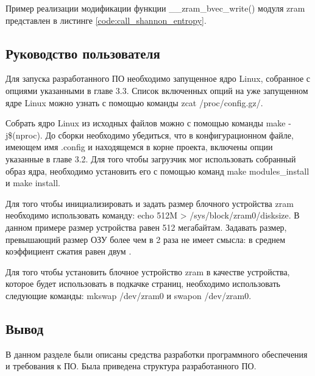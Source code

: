 Пример реализации модификации функции \_\_zram\_bvec\_write() модуля zram представлен в листинге \ref{code:call_shannon_entropy}. 

\newpage


\subsection{Руководство пользователя}

Для запуска разработанного ПО необходимо запущенное ядро Linux, собранное с опциями указанными в главе 3.3. Список включенных опций на уже запущенном ядре Linux можно узнать с помощью команды zcat /proc/config.gz/.

Собрать ядро Linux из исходных файлов можно с помощью команды make -j\$(nproc). До сборки необходимо убедиться, что в конфигурационном файле, имеющем имя .config и находящемся в корне проекта, включены опции указанные в главе 3.2. Для того чтобы загрузчик мог использовать собранный образ ядра, необходимо установить его с помощью команд  make modules\_install и make install.

Для того чтобы инициализировать и задать размер блочного устройства zram необходимо использовать команду: echo 512M > /sys/block/zram0/disksize. В данном примере размер устройства равен 512 мегабайтам. Задавать размер, превышающий размер ОЗУ более чем в 2 раза не имеет смысла: в среднем коэффициент сжатия равен двум \cite{zram}.

Для того чтобы установить блочное устройство zram в качестве устройства, которое будет использовать в подкачке страниц, необходимо использовать следующие команды: mkswap /dev/zram0 и swapon /dev/zram0.

\subsection{Вывод}

В данном разделе были описаны средства разработки программного обеспечения и требования к ПО. Была приведена структура разработанного ПО.
\pagebreak